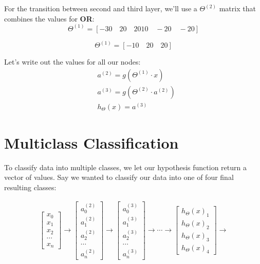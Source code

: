 For the transition between second and third layer, we'll use a $\Theta^{(2)}$ matrix that combines the values for \textbf{OR}:
\begin{equation*}
\Theta^{(1)} = [-30\quad 20 \quad 2010 \quad -20 \quad -20]
\end{equation*}

\begin{equation*}
\Theta^{(1)} = [-10\quad 20 \quad 20]
\end{equation*}

Let's write out the values for all our nodes:
\begin{align*}
& a^{(2)} = g(\Theta^{(1)} \cdot x) \\
& a^{(3)} = g(\Theta^{(2)} \cdot a^{(2)}) \\
& h_\Theta(x) = a^{(3)}
\end{align*}
\section{Multiclass Classification}

To classify data into multiple classes, we let our hypothesis function return a vector of values. Say we wanted to classify our data into one of four final resulting classes:

\begin{align*}
\begin{bmatrix} x_0 \\ x_1 \\ x_2 \\ \cdots \\ x_n \end{bmatrix} 
\rightarrow
\begin{bmatrix} a_0^{(2)} \\ a_1^{(2)} \\ a_2^{(2)} \\ \cdots \\ a_n^{(2)} \end{bmatrix} 
\rightarrow
\begin{bmatrix} a_0^{(3)} \\ a_1^{(3)} \\ a_2^{(3)} \\ \cdots \\ a_n^{(3)} \end{bmatrix} 
\rightarrow  \cdots \rightarrow
\begin{bmatrix} h_\Theta(x)_1 \\ h_\Theta(x)_2 \\ h_\Theta(x)_3 \\ h_\Theta(x)_4 \end{bmatrix} 
\rightarrow
\end{align*}

